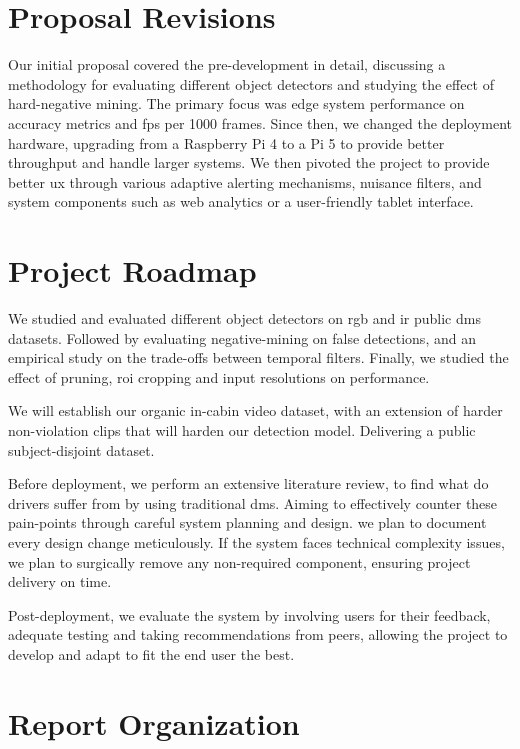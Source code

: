 \section{Proposal Revisions}

Our initial proposal covered the pre-development in detail, discussing a methodology for evaluating different object detectors and studying the effect of hard-negative mining. The primary focus was edge system performance on accuracy metrics and \glspl{fp} per 1000 frames. Since then, we changed the deployment hardware, upgrading from a Raspberry Pi 4 to a Pi 5 to provide better throughput and handle larger systems. We then pivoted the project to provide better \gls{ux} through various adaptive alerting mechanisms, nuisance filters, and system components such as web analytics or a user-friendly tablet interface.



\section{Project Roadmap}



We studied and evaluated different object detectors on \gls{rgb} and \gls{ir} public \gls{dms} datasets. Followed by evaluating negative-mining on false detections, and an empirical study on the trade-offs between temporal filters. Finally, we studied the effect of pruning, \gls{roi} cropping and input resolutions on performance. 

We will establish our organic in-cabin video dataset, with an extension of harder non-violation clips that will harden our detection model. Delivering a public subject-disjoint dataset. 

Before deployment, we perform an extensive literature review, to find what do drivers suffer from by using traditional \gls{dms}. Aiming to effectively counter these pain-points through careful system planning and design. we plan to document every design change meticulously. If the system faces technical complexity issues, we plan to surgically remove any non-required component, ensuring project delivery on time.

Post-deployment, we evaluate the system by involving users for their feedback, adequate testing and taking recommendations from peers, allowing the project to develop and adapt to fit the end user the best.


\section{Report Organization}

